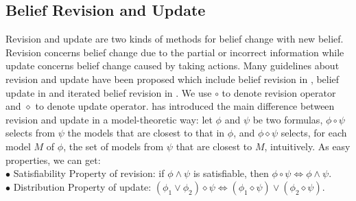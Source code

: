 \documentclass{llncs}
\begin{document}
\subsection{Belief Revision and Update}
Revision and update are two kinds of methods for belief change with new belief. Revision concerns belief change due to the partial or incorrect information while update concerns belief change caused by taking actions. Many guidelines about revision and update have been proposed which include belief revision in \cite{alchourron1985logic}, belief update in \cite{mendelzon1991difference} and iterated belief revision in \cite{darwiche1997logic}. We use $\circ$ to denote revision operator and $\diamond$ to denote update operator.  \cite{mendelzon1991difference} has introduced the main difference between revision and update in a model-theoretic way: let $\phi$ and $\psi$ be two formulas, $\phi\circ\psi$ selects from $\psi$ the models that are closest to that in $\phi$, and $\phi\diamond\psi$ selects, for each model $M$ of $\phi$, the set of models from $\psi$ that are closest to $M$, intuitively. As easy properties, we can get:\\
\hspace*{0.1in}$\bullet$ Satisfiability Property of revision: if $\phi\land\psi$ is satisfiable, then $\phi\circ\psi\Leftrightarrow\phi\land\psi$.\\
\hspace*{0.1in}$\bullet$ Distribution Property of update: $(\phi_1\lor\phi_2)\diamond\psi\Leftrightarrow(\phi_1\diamond\psi)\lor(\phi_2\diamond\psi)$.
\end{document}
